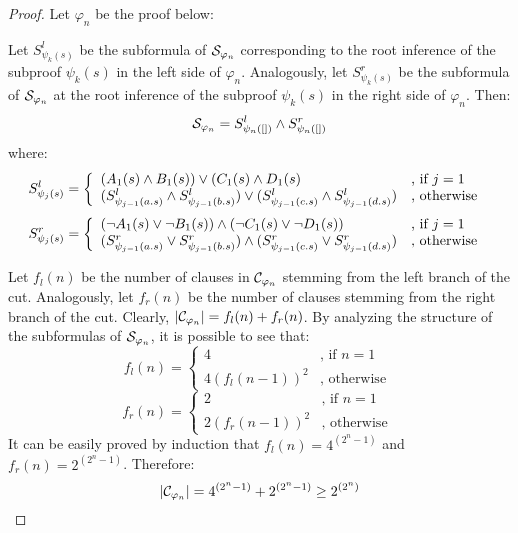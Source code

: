 \begin{proof}
\noindent
Let $\varphi_n$ be the proof below:
\begin{small}
\begin{prooftree}
		 
\end{prooftree}
\end{small}

\noindent
Let $S_{\psi_k(s)}^l$ be the subformula of $\struct{\varphi_n}$ corresponding to the root inference of the subproof $\psi_k(s)$ in the left side of $\varphi_n$. Analogously, let $S_{\psi_k(s)}^r$ be the subformula of $\struct{\varphi_n}$ at the root inference of the subproof $\psi_k(s)$ in the right side of $\varphi_n$. Then:
$$
\struct{\varphi_n} = S_{\psi_n([])}^l \structplus S_{\psi_n([])}^r
$$
%
where:
$$
S_{\psi_j(s)}^l = \left\{ \begin{array}{ll}
(A_1(s) \structplus B_1(s)) \structtimes (C_1(s) \structplus D_1(s) & \textrm{, if } j=1 \\
(S_{\psi_{j-1}(a.s)}^l \structplus S_{\psi_{j-1}(b.s)}^l) \structtimes (S_{\psi_{j-1}(c.s)}^l \structplus S_{\psi_{j-1}(d.s)}^l) & \textrm{, otherwise }
\end{array}\right.
$$
$$
S_{\psi_j(s)}^r = \left\{ \begin{array}{ll}
  (\neg A_1(s) \structtimes \neg B_1(s)) 
  \structplus
  (\neg C_1(s) \structtimes \neg D_1(s))  & \textrm{, if } j=1 \\
  (S_{\psi_{j-1}(a.s)}^r \structtimes S_{\psi_{j-1}(b.s)}^r) 
  \structplus
  (S_{\psi_{j-1}(c.s)}^r \structtimes S_{\psi_{j-1}(d.s)}^r) & \textrm{, otherwise }
\end{array}\right.
$$

\noindent
Let $f_l(n)$ be the number of clauses in $\clauseset{\varphi_n}$ stemming from the left branch of the cut. Analogously, let $f_r(n)$ be the number of clauses stemming from the right branch of the cut. Clearly, $|\clauseset{\varphi_n}| = f_l(n) + f_r(n)$. By analyzing the structure of the subformulas of $\struct{\varphi_n}$, it is possible to see that:
$$
f_l(n) = \left\{ \begin{array}{ll}
4 & \textrm{, if } n=1 \\
4 (f_l(n-1))^2 & \textrm{, otherwise }
\end{array}\right.
$$
$$
f_r(n) = \left\{ \begin{array}{ll}
2 & \textrm{, if } n=1 \\
2 (f_r(n-1))^2 & \textrm{, otherwise }
\end{array}\right.
$$
%
It can be easily proved by induction that $f_l(n) = 4^{(2^n - 1)}$ and $f_r(n) = 2^{(2^n - 1)}$. Therefore:
$$
|\clauseset{\varphi_n}| = 4^{(2^n - 1)} + 2^{(2^n - 1)} \geq 2^{(2^n)} 
$$
\hfill\QED
\end{proof}



